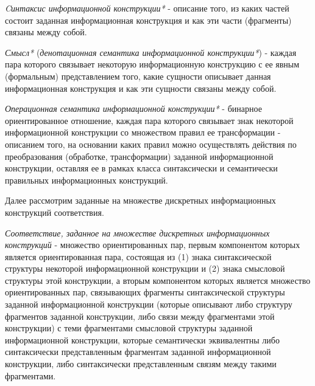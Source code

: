 \textit{Cинтаксис информационной конструкции*} - описание того, из каких частей состоит заданная информационная конструкция и как эти части (фрагменты) связаны между собой.

\textit{Смысл*} (\textit{денотационная семантика информационной конструкции*}) - каждая пара которого связывает некоторую информационную конструкцию с ее явным (формальным) представлением того, какие сущности описывает данная информационная конструкция и как эти сущности связаны между собой.

\textit{Операционная семантика информационной конструкции*} - бинарное ориентированное отношение, каждая пара которого связывает знак некоторой информационной конструкции со множеством правил ее трансформации - описанием того, на основании каких правил можно осуществлять действия по преобразования (обработке, трансформации) заданной информационной конструкции, оставляя ее в рамках класса синтаксически и семантически правильных информационных конструкций.

\begin{SCn}


\end{SCn}

Далее рассмотрим заданные на множестве дискретных информационных конструкций соответствия.

\begin{SCn}

    \begin{scnindent}
    \end{scnindent}

\end{SCn}

\textit{Соответствие, заданное на множестве дискретных информационных конструкций} - множество ориентированных пар, первым компонентом которых является ориентированная пара, состоящая из (1) знака синтаксической структуры некоторой информационной конструкции и (2) знака смысловой структуры этой конструкции, а вторым компонентом которых является множество ориентированных пар, связывающих фрагменты синтаксической структуры заданной информационной конструкции (которые описывают либо структуру фрагментов заданной конструкции, либо связи между фрагментами этой конструкции) с теми фрагментами смысловой структуры заданной информационной конструкции, которые семантически эквивалентны либо синтаксически представленным фрагментам заданной информационной конструкции, либо синтаксически представленным связям между такими фрагментами.

